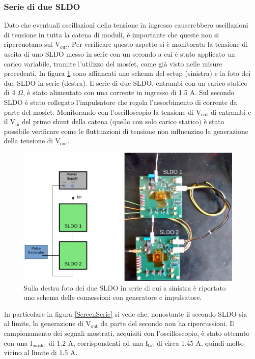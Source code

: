 \subsubsection{Serie di due SLDO}

Dato che eventuali oscillazioni della tensione in ingresso causerebbero oscillazioni di tensione in tutta la catena di moduli, è importante che queste non si ripercuotano sul $\mathrm{V_{out}}$. 
Per verificare questo aspetto si è monitorata la tensione di uscita di uno SLDO messo in serie con un secondo a cui è stato applicato un carico variabile, tramite l'utilizzo del mosfet, come già visto nelle misure precedenti.
In figura \ref{SLDOserie} sono affiancati uno schema del setup (sinistra) e la foto dei due SLDO in serie (destra). 
Il serie di due SLDO, entrambi con un carico statico di 4 $\Omega$, è stato alimentato con una corrente in ingresso di 1.5 A.
Sul secondo SLDO è stato collegato l'impulsatore che regola l'assorbimento di corrente  da parte del mosfet. 
Monitorando con l'oscilloscopio la tensione di $\mathrm{V_{out}}$ di entrambi e il $\mathrm{V_{in}}$ del primo shunt della catena (quello con solo carico statico) è stato possibile verificare come le fluttuazioni di tensione non influenzino la generazione della tensione di $\mathrm{V_{out}}$.
\begin{figure}[h!]
\centering
\includegraphics[scale=.30]{Immagini/SLDOserie}
\caption{Sulla destra foto dei due SLDO in serie di cui a sinistra è riportato uno schema delle connessioni con generatore e impulsatore.}
\label{SLDOserie}
\end{figure}
In particolare in figura \ref{ScreenSerie} si vede che, nonostante il secondo SLDO sia al limite, la generazione di $\mathrm{V_{out}}$ da parte del secondo non ha ripercussioni. 
Il campionamento dei segnali mostrati, acquisiti con l'oscilloscopio, è stato ottenuto con una $\mathrm{I_{mosfet}}$ di 1.2 A, corrispondenti ad una $\mathrm{I_{tot}}$ di circa 1.45 A, quindi molto vicino al limite di 1.5 A. 
